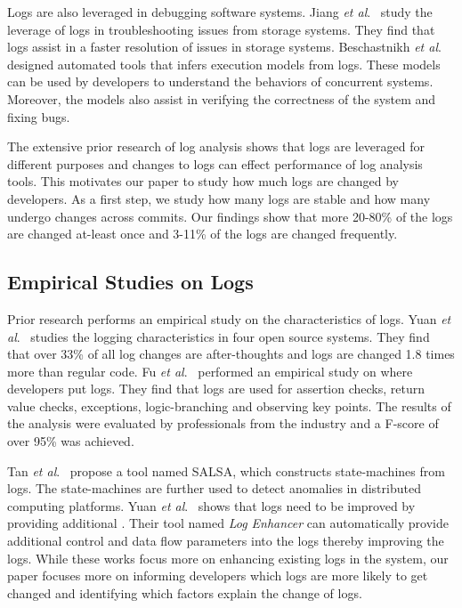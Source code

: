 Logs are also leveraged in debugging software systems. Jiang \textsl{et al}$ . $~\cite{Jiang:2009:UCP:1525908.1525912} study the leverage of logs in troubleshooting issues from storage systems. They find that logs assist in a faster resolution of issues in storage systems. Beschastnikh \textsl{et al}$ . $~\cite{Beschastnikh:2011:LEI:2025113.2025151} designed automated tools that infers execution models from logs. These models can be used by developers to understand the behaviors of concurrent systems. Moreover, the models also assist in verifying the correctness of the system and fixing bugs.


The extensive prior research of log analysis shows that logs are leveraged for different purposes and changes to logs can effect performance  of log analysis tools. This motivates our paper to study how much logs are changed by developers. As a first step, we study how many logs are stable and how many undergo changes across commits. Our findings show that more 20-80\% of the logs are changed at-least once and 3-11\% of the logs are changed frequently. 


\subsection{Empirical Studies on Logs}


Prior research performs an empirical study on the characteristics of logs. Yuan \textsl{et al}$ . $~\cite{Characterizinglogs} studies the logging characteristics in four open source systems. They find that over 33\% of all log changes are after-thoughts and logs are changed 1.8 times more than regular code. Fu \textsl{et al$.$}~\cite{Fu1} performed an empirical study on where developers put logs. They find that logs are used for assertion checks, return value checks, exceptions, logic-branching and observing key points. The results of the analysis were evaluated by professionals from the industry and a F-score of over 95\% was achieved. 

Tan \textsl{et al}$ . $~\cite{TanSalsa} propose a tool named SALSA, which constructs state-machines from logs. The state-machines are further used to detect anomalies in distributed computing platforms. Yuan\textsl{ et al$ . $}~\cite{Yuan} shows that logs need to be improved by providing additional . Their tool named \emph{Log Enhancer} can automatically provide additional control and data flow parameters into the logs thereby improving the logs. While these works focus more on enhancing existing logs in the system, our paper focuses more on informing developers which logs are more likely to get changed and identifying which factors explain the change of logs. 


